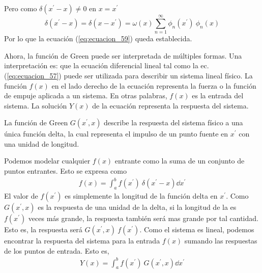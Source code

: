 Pero como $\delta (x^{\prime} - x) \neq 0$ en $x = x^{\prime}$
\begin{equation}
\delta (x^{\prime} - x) = \delta (x - x^{\prime}) = \omega (x) \sum_{n=1}^{\infty} \phi_{n}(x^{\prime}) \: \phi_{n}(x)
\label{eq:ecuacion_60}
\end{equation}
Por lo que la ecuación (\ref{eq:ecuacion_59}) queda establecida.
\par
Ahora, la función de Green puede ser interpretada de múltiples formas. Una interpretación es: que la ecuación diferencial lineal tal como la ec. (\ref{eq:ecuacion_57}) puede ser utilizada para describir un sistema lineal físico. La función $f(x)$ en el lado derecho de la ecuación representa la fuerza o la función de empuje aplicada a un sistema. En otras palabras, $f(x)$ es la entrada del sistema. La solución $Y(x)$ de la ecuación representa la respuesta del sistema.
\par
La función de Green $G(x^{\prime}, x)$ describe la respuesta del sistema físico a una única función delta, la cual representa el impulso de un punto fuente en $x^{\prime}$ con una unidad de longitud.
\par
Podemos modelar cualquier $f(x)$ entrante como la suma de un conjunto de puntos entrantes. Esto se expresa como
\begin{align*}
f(x) = \int_{a}^{b} f(x^{\prime}) \: \delta (x^{\prime} - x) \dd{x^{\prime}}
\end{align*}
El valor de $f(x^{\prime})$ es simplemente la longitud de la función delta en $x^{\prime}$. Como $G(x^{\prime}, x)$ es la respuesta de una unidad de la delta, si la longitud de la es $f(x^{\prime})$ veces más grande, la respuesta también será mas grande por tal cantidad. Esto es, la respuesta será $G(x^{\prime}, x) \: f(x^{\prime})$. Como el sistema es lineal, podemos encontrar la respuesta del sistema para la entrada $f(x)$ sumando las respuestas de los puntos de entrada. Esto es,
\begin{align*}
Y(x) = \int_{a}^{b} f(x^{\prime}) \: G(x^{\prime}, x) \dd{x^{\prime}}
\end{align*}
